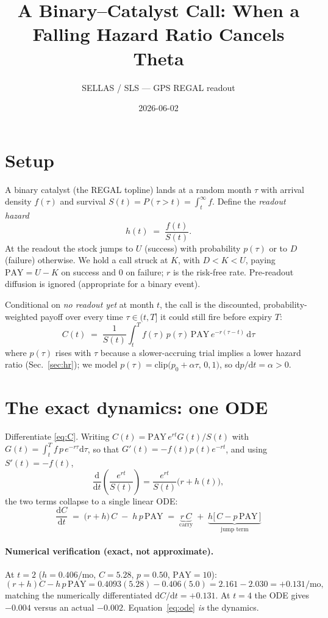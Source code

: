 \documentclass[11pt]{article}
\title{\vspace{-2em}A Binary--Catalyst Call: When a Falling Hazard Ratio Cancels Theta}
\author{SELLAS / SLS --- GPS REGAL readout}
\date{2026-06-02}
\newcommand{\PAY}{\mathrm{PAY}}
\newcommand{\dd}{\mathrm{d}}
\begin{document}
\maketitle
\vspace{-1.5em}

\section*{Setup}

A binary catalyst (the REGAL topline) lands at a random month $\tau$ with arrival density
$f(\tau)$ and survival $S(t)=P(\tau>t)=\int_t^\infty f$. Define the \emph{readout hazard}
\[
  h(t)\;=\;\frac{f(t)}{S(t)}.
\]
At the readout the stock jumps to $U$ (success) with probability $p(\tau)$ or to $D$ (failure)
otherwise. We hold a call struck at $K$, with $D<K<U$, paying
$\PAY=U-K$ on success and $0$ on failure; $r$ is the risk-free rate. Pre-readout
diffusion is ignored (appropriate for a binary event).

Conditional on \emph{no readout yet} at month $t$, the call is the discounted,
probability-weighted payoff over every time $\tau\in(t,T]$ it could still fire before
expiry $T$:
\begin{equation}
  \boxed{\;C(t)\;=\;\frac{1}{S(t)}\int_t^T f(\tau)\,p(\tau)\,\PAY\,e^{-r(\tau-t)}\,\dd\tau\;}
  \label{eq:C}
\end{equation}
where $p(\tau)$ rises with $\tau$ because a slower-accruing trial implies a lower hazard
ratio (Sec.~\ref{sec:hr}); we model $p(\tau)=\mathrm{clip}\!\big(p_0+\alpha\tau,\,0,1\big)$,
so $\dd p/\dd t=\alpha>0$.

\section*{The exact dynamics: one ODE}

Differentiate \eqref{eq:C}. Writing $C(t)=\PAY\,e^{rt}G(t)/S(t)$ with
$G(t)=\int_t^T f\,p\,e^{-r\tau}\dd\tau$, so that $G'(t)=-f(t)p(t)e^{-rt}$, and using
$S'(t)=-f(t)$,
\[
  \frac{\dd}{\dd t}\!\left(\frac{e^{rt}}{S(t)}\right)
  = \frac{e^{rt}}{S(t)}\big(r+h(t)\big),
\]
the two terms collapse to a single linear ODE:
\begin{equation}
  \boxed{\;\frac{\dd C}{\dd t}
  \;=\;\big(r+h\big)\,C\;-\;h\,p\,\PAY
  \;=\;\underbrace{r\,C}_{\text{carry}}
  \;+\;\underbrace{h\big[\,C-p\,\PAY\,\big]}_{\text{jump term}}\;}
  \label{eq:ode}
\end{equation}

\paragraph{Numerical verification (exact, not approximate).}
At $t=2$ ($h=0.406/\text{mo}$, $C=5.28$, $p=0.50$, $\PAY=10$):
\[
  (r+h)C-h\,p\,\PAY
  = 0.4093(5.28)-0.406(5.0)
  = 2.161-2.030 = +0.131/\text{mo},
\]
matching the numerically differentiated $\dd C/\dd t=+0.131$. At $t=4$ the ODE gives
$-0.004$ versus an actual $-0.002$. Equation~\eqref{eq:ode} \emph{is} the dynamics.
\end{document}
